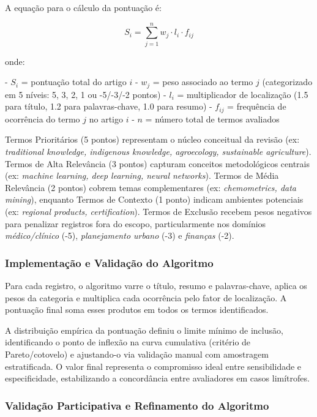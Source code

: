A equação para o cálculo da pontuação é:

\[
S_i = \sum_{j=1}^{n} w_j \cdot l_i \cdot f_{ij}
\]

onde:

- \(S_i\) = pontuação total do artigo \(i\)
- \(w_j\) = peso associado ao termo \(j\) (categorizado em 5 níveis: 5, 3, 2, 1 ou -5/-3/-2 pontos)
- \(l_i\) = multiplicador de localização (1.5 para título, 1.2 para palavras-chave, 1.0 para resumo)
- \(f_{ij}\) = frequência de ocorrência do termo \(j\) no artigo \(i\)
- \(n\) = número total de termos avaliados

Termos Prioritários (5 pontos) representam o núcleo conceitual da revisão (ex: \textit{traditional knowledge, indigenous knowledge, agroecology, sustainable agriculture}). Termos de Alta Relevância (3 pontos) capturam conceitos metodológicos centrais (ex: \textit{machine learning, deep learning, neural networks}). Termos de Média Relevância (2 pontos) cobrem temas complementares (ex: \textit{chemometrics, data mining}), enquanto Termos de Contexto (1 ponto) indicam ambientes potenciais (ex: \textit{regional products, certification}). Termos de Exclusão recebem pesos negativos para penalizar registros fora do escopo, particularmente nos domínios \textit{médico/clínico} (-5), \textit{planejamento urbano} (-3) e \textit{finanças} (-2).

\subsubsection{Implementação e Validação do Algoritmo}

Para cada registro, o algoritmo varre o título, resumo e palavras-chave, aplica os pesos da categoria e multiplica cada ocorrência pelo fator de localização. A pontuação final soma esses produtos em todos os termos identificados.

A distribuição empírica da pontuação definiu o limite mínimo de inclusão, identificando o ponto de inflexão na curva cumulativa (critério de Pareto/cotovelo) e ajustando-o via validação manual com amostragem estratificada. O valor final representa o compromisso ideal entre sensibilidade e especificidade, estabilizando a concordância entre avaliadores em casos limítrofes.

\subsubsection{Validação Participativa e Refinamento do Algoritmo}

